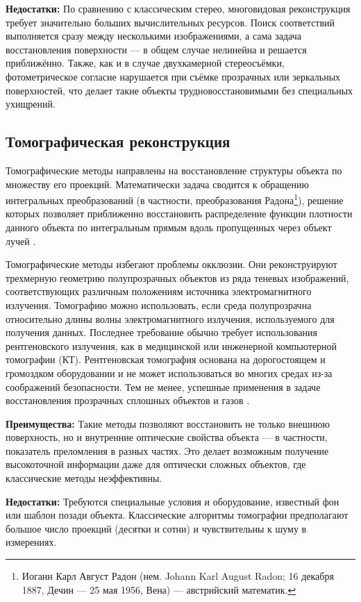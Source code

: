 \textbf{Недостатки:} По сравнению с классическим стерео, многовидовая
реконструкция требует значительно больших вычислительных ресурсов. Поиск
соответствий выполняется сразу между несколькими изображениями, а сама задача
восстановления поверхности — в общем случае нелинейна и решается приближённо.
Также, как и в случае двухкамерной стереосъёмки, фотометрическое согласие
нарушается при съёмке прозрачных или зеркальных поверхностей, что делает такие
объекты трудновосстановимыми без специальных ухищрений.

\subsection{Томографическая реконструкция}

Томографические методы направлены на восстановление структуры объекта
по множеству его проекций. Математически задача сводится к
обращению интегральных преобразований (в частности, преобразования
Радона\footnote{ Иоганн Карл Август Радон (нем. Johann Karl August Radon; 16
декабря 1887, Дечин — 25 мая 1956, Вена) — австрийский математик.  }), решение
которых позволяет приближенно восстановить распределение функции плотности
данного объекта по интегральным прямым вдоль пропущенных через объект лучей
\cite{book:869357}.

Томографические методы избегают проблемы окклюзии. Они реконструируют трехмерную
геометрию полупрозрачных объектов из ряда теневых изображений, соответствующих
различным положениям источника электромагнитного излучения. Томографию можно
использовать, если среда полупрозрачна относительно длины волны
электромагнитного излучения, используемого для получения данных.  Последнее
требование обычно требует использования рентгеновского излучения, как в
медицинской или инженерной компьютерной томографии (КТ). Рентгеновская
томография основана на дорогостоящем и громоздком оборудовании и не может
использоваться во многих средах из-за соображений безопасности. Тем не менее,
успешные применения в задаче восстановления прозрачных сплошных объектов
\cite{10.1145/1179849.1179918} и газов \cite{IHRKE2006484}.

\textbf{Преимущества:} Такие методы позволяют восстановить не только внешнюю
поверхность, но и внутренние оптические свойства объекта — в частности,
показатель преломления в разных частях. Это делает возможным получение
высокоточной информации даже для оптически сложных объектов, где классические методы
неэффективны.

\textbf{Недостатки:} Требуются специальные условия и оборудование,
известный фон или шаблон позади объекта. Классические алгоритмы томографии
предполагают большое число проекций (десятки и сотни) и чувствительны
к шуму в измерениях.

